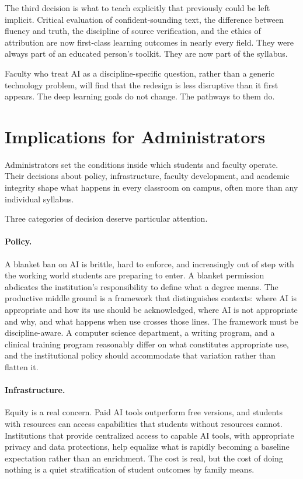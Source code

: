 \documentclass[12pt]{article}
\begin{document}
The third decision is what to teach explicitly that previously could be left implicit. Critical evaluation of confident-sounding text, the difference between fluency and truth, the discipline of source verification, and the ethics of attribution are now first-class learning outcomes in nearly every field. They were always part of an educated person's toolkit. They are now part of the syllabus.

Faculty who treat AI as a discipline-specific question, rather than a generic technology problem, will find that the redesign is less disruptive than it first appears. The deep learning goals do not change. The pathways to them do.

\section{Implications for Administrators}

Administrators set the conditions inside which students and faculty operate. Their decisions about policy, infrastructure, faculty development, and academic integrity shape what happens in every classroom on campus, often more than any individual syllabus.

Three categories of decision deserve particular attention.

\paragraph{Policy.} A blanket ban on AI is brittle, hard to enforce, and increasingly out of step with the working world students are preparing to enter. A blanket permission abdicates the institution's responsibility to define what a degree means. The productive middle ground is a framework that distinguishes contexts: where AI is appropriate and how its use should be acknowledged, where AI is not appropriate and why, and what happens when use crosses those lines. The framework must be discipline-aware. A computer science department, a writing program, and a clinical training program reasonably differ on what constitutes appropriate use, and the institutional policy should accommodate that variation rather than flatten it.

\paragraph{Infrastructure.} Equity is a real concern. Paid AI tools outperform free versions, and students with resources can access capabilities that students without resources cannot. Institutions that provide centralized access to capable AI tools, with appropriate privacy and data protections, help equalize what is rapidly becoming a baseline expectation rather than an enrichment. The cost is real, but the cost of doing nothing is a quiet stratification of student outcomes by family means.
\end{document}
